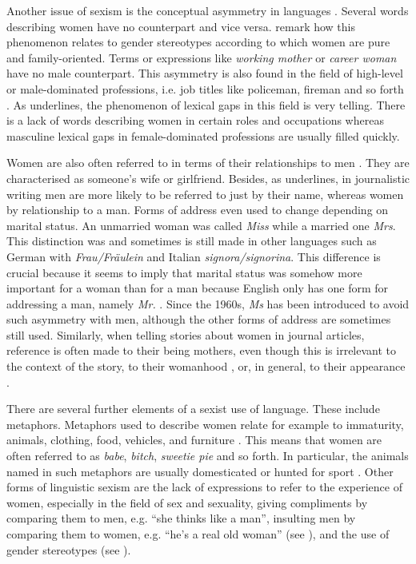 Another issue of sexism is the conceptual asymmetry in languages \citep[15]{litosseliti2014gender}. Several words describing women have no counterpart and vice versa. \textcite[5f]{menegatti2017gender} remark how this phenomenon relates to gender stereotypes according to which women are pure and family-oriented. Terms or expressions like \textit{working mother} or \textit{career woman} have no male counterpart. This asymmetry is also found in the field of high-level or male-dominated professions, i.e. job titles like policeman, fireman and so forth \citep[6]{menegatti2017gender}. As \textcite[553]{pauwels2003linguistic} underlines, the phenomenon of lexical gaps in this field is very telling. There is a lack of words describing women in certain roles and occupations whereas masculine lexical gaps in female-dominated professions are usually filled quickly.

Women are also often referred to in terms of their relationships to men \citep[65]{lakoff1973language}. They are characterised as someone’s wife or girlfriend. Besides, as \textcite[65f]{lakoff1973language} underlines, in journalistic writing men are more likely to be referred to just by their name, whereas women by relationship to a man. Forms of address even used to change depending on marital status. An unmarried woman was called \textit{Miss} while a married one  \textit{Mrs}. This distinction was and sometimes is still made in other languages such as German with \textit{Frau/Fräulein} and Italian \textit{signora/signorina}. This difference is crucial because it seems to imply that marital status was somehow more important for a woman than for a man because English only has one form for addressing a man, namely \textit{Mr.} \citep[21]{weatherall2002gender}. Since the 1960s, \textit{Ms} has been introduced to avoid such asymmetry with men, although the other forms of address are sometimes still used. Similarly, when telling stories about women in journal articles, reference is often made to their being mothers, even though this is irrelevant to the context of the story, to their womanhood \citep{murgia2021stai}, or, in general, to their appearance \citep[19]{weatherall2002gender}.

There are several further elements of a sexist use of language. These include metaphors. Metaphors used to describe women relate for example to immaturity, animals, clothing, food, vehicles, and furniture \citep{weatherall1999metaphorical}. This means that women are often referred to as \textit{babe}, \textit{bitch}, \textit{sweetie pie} and so forth. In particular, the animals named in such metaphors are usually domesticated or hunted for sport \citep{weatherall1999metaphorical}. Other forms of linguistic sexism are the lack of expressions to refer to the experience of women, especially in the field of sex and sexuality, giving compliments by comparing them to men, e.g. ``she thinks like a man'', insulting men by comparing them to women, e.g. ``he's a real old woman'' (see \cite{weatherall2002gender}), and the use of gender stereotypes (see \cite{apagenderenglish}).


